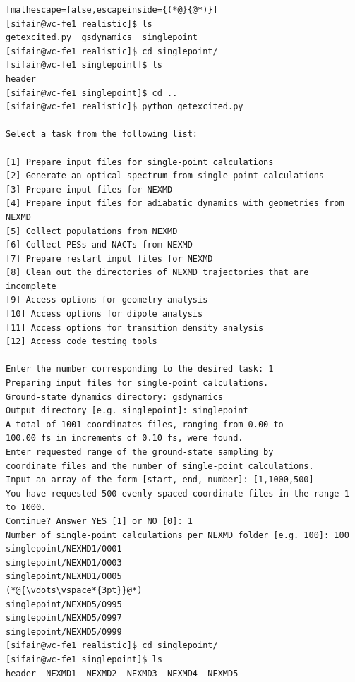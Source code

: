 \documentclass[letterpaper,12pt,titlepage]{article}
\begin{document}
\begin{lstlisting}[mathescape=false,escapeinside={(*@}{@*)}]
[sifain@wc-fe1 realistic]$ ls
getexcited.py  gsdynamics  singlepoint
[sifain@wc-fe1 realistic]$ cd singlepoint/
[sifain@wc-fe1 singlepoint]$ ls
header
[sifain@wc-fe1 singlepoint]$ cd ..
[sifain@wc-fe1 realistic]$ python getexcited.py 

Select a task from the following list:

[1] Prepare input files for single-point calculations
[2] Generate an optical spectrum from single-point calculations
[3] Prepare input files for NEXMD
[4] Prepare input files for adiabatic dynamics with geometries from NEXMD
[5] Collect populations from NEXMD
[6] Collect PESs and NACTs from NEXMD
[7] Prepare restart input files for NEXMD
[8] Clean out the directories of NEXMD trajectories that are incomplete
[9] Access options for geometry analysis
[10] Access options for dipole analysis
[11] Access options for transition density analysis
[12] Access code testing tools

Enter the number corresponding to the desired task: 1
Preparing input files for single-point calculations.
Ground-state dynamics directory: gsdynamics
Output directory [e.g. singlepoint]: singlepoint
A total of 1001 coordinates files, ranging from 0.00 to 
100.00 fs in increments of 0.10 fs, were found.
Enter requested range of the ground-state sampling by 
coordinate files and the number of single-point calculations.
Input an array of the form [start, end, number]: [1,1000,500]
You have requested 500 evenly-spaced coordinate files in the range 1 to 1000.
Continue? Answer YES [1] or NO [0]: 1
Number of single-point calculations per NEXMD folder [e.g. 100]: 100
singlepoint/NEXMD1/0001
singlepoint/NEXMD1/0003
singlepoint/NEXMD1/0005
(*@{\vdots\vspace*{3pt}}@*)
singlepoint/NEXMD5/0995
singlepoint/NEXMD5/0997
singlepoint/NEXMD5/0999
[sifain@wc-fe1 realistic]$ cd singlepoint/
[sifain@wc-fe1 singlepoint]$ ls
header  NEXMD1  NEXMD2  NEXMD3  NEXMD4  NEXMD5
\end{lstlisting}
\end{document}

